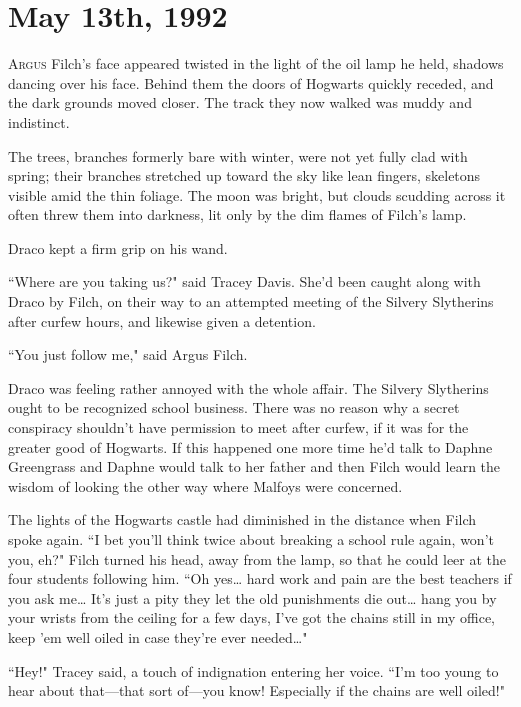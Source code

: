 
\section{May 13th, 1992}

\lettrine{A}{rgus} Filch's face appeared twisted in the light of the oil lamp he held, shadows dancing over his face. Behind them the doors of Hogwarts quickly receded, and the dark grounds moved closer. The track they now walked was muddy and indistinct.

The trees, branches formerly bare with winter, were not yet fully clad with spring; their branches stretched up toward the sky like lean fingers, skeletons visible amid the thin foliage. The moon was bright, but clouds scudding across it often threw them into darkness, lit only by the dim flames of Filch's lamp.

Draco kept a firm grip on his wand.

``Where are you taking us?" said Tracey Davis. She'd been caught along with Draco by Filch, on their way to an attempted meeting of the Silvery Slytherins after curfew hours, and likewise given a detention.

``You just follow me," said Argus Filch.

Draco was feeling rather annoyed with the whole affair. The Silvery Slytherins ought to be recognized school business. There was no reason why a secret conspiracy shouldn't have permission to meet after curfew, if it was for the greater good of Hogwarts. If this happened one more time he'd talk to Daphne Greengrass and Daphne would talk to her father and then Filch would learn the wisdom of looking the other way where Malfoys were concerned.

The lights of the Hogwarts castle had diminished in the distance when Filch spoke again. ``I bet you'll think twice about breaking a school rule again, won't you, eh?" Filch turned his head, away from the lamp, so that he could leer at the four students following him. ``Oh yes{\ldots} hard work and pain are the best teachers if you ask me{\ldots} It's just a pity they let the old punishments die out{\ldots} hang you by your wrists from the ceiling for a few days, I've got the chains still in my office, keep 'em well oiled in case they're ever needed{\ldots}"

``Hey!" Tracey said, a touch of indignation entering her voice. ``I'm too young to hear about that—that sort of—you know! Especially if the chains are well oiled!"

